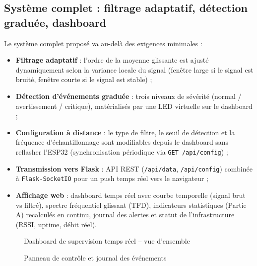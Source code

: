 \documentclass[11pt,a4paper]{article}
\begin{document}
\subsection{Système complet : filtrage adaptatif, détection graduée, dashboard}

Le système complet proposé va au-delà des exigences minimales :

\begin{itemize}[label=--]
    \item \textbf{Filtrage adaptatif} : l'ordre de la moyenne glissante est ajusté dynamiquement selon la variance locale du signal (fenêtre large si le signal est bruité, fenêtre courte si le signal est stable) ;
    \item \textbf{Détection d'événements graduée} : trois niveaux de sévérité (normal / avertissement / critique), matérialisés par une LED virtuelle sur le dashboard ;
    \item \textbf{Configuration à distance} : le type de filtre, le seuil de détection et la fréquence d'échantillonnage sont modifiables depuis le dashboard sans reflasher l'ESP32 (synchronisation périodique via \texttt{GET /api/config}) ;
    \item \textbf{Transmission vers Flask} : API REST (\texttt{/api/data}, \texttt{/api/config}) combinée à \texttt{Flask-SocketIO} pour un push temps réel vers le navigateur ;
    \item \textbf{Affichage web} : dashboard temps réel avec courbe temporelle (signal brut vs filtré), spectre fréquentiel glissant (TFD), indicateurs statistiques (Partie A) recalculés en continu, journal des alertes et statut de l'infrastructure (RSSI, uptime, débit réel).
\end{itemize}

\begin{figure}[H]
    \centering
    \caption{Dashboard de supervision temps réel -- vue d'ensemble}
    \label{fig:dashboard_overview}
\end{figure}

\begin{figure}[H]
    \centering
    \caption{Panneau de contrôle et journal des événements}
    \label{fig:dashboard_control}
\end{figure}
\end{document}
